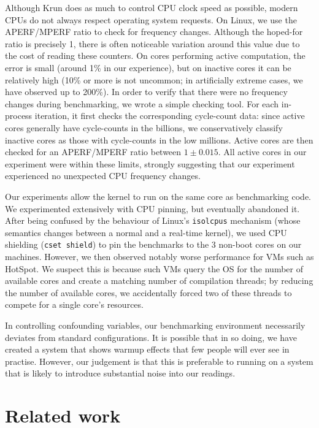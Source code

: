\documentclass[preprint,numbers,10pt]{sigplanconf}
\newcommand{\krun}{Krun\xspace}
\begin{document}
Although \krun does as much to control CPU clock speed as possible, modern CPUs
do not always respect operating system requests. On Linux, we use the
APERF/MPERF ratio to check for frequency changes. Although the hoped-for
ratio is precisely 1, there is often noticeable variation around this value due to the
cost of reading these counters. On cores
performing active computation, the error is small (around 1\% in our
experience), but on inactive cores it can be relatively high (10\% or more is
not uncommon; in artificially extreme cases, we have observed up to 200\%).
In order to verify that there were no frequency changes during benchmarking,
we wrote a simple checking tool. For each in-process iteration, it first checks
the corresponding cycle-count data: since active cores generally have
cycle-counts in the billions, we conservatively classify inactive
cores as those with cycle-counts in the low millions. Active cores are then
checked for an APERF/MPERF ratio between $1 \pm 0.015$. All active cores in our
experiment were within these limits, strongly suggesting that our experiment
experienced no unexpected CPU frequency changes.

Our experiments allow the kernel to run on the same core as benchmarking code.
We experimented extensively with CPU pinning, but eventually abandoned it. After
being confused by the behaviour of Linux's \texttt{isolcpus} mechanism (whose
semantics changes between a normal and a real-time kernel), we used CPU shielding
(\texttt{cset shield}) to pin the benchmarks to the 3 non-boot cores on our
machines. However, we then observed notably worse performance for VMs such as
HotSpot. We suspect this is because such VMs query the OS for the number of
available cores and create a matching number of compilation threads; by reducing
the number of available cores, we accidentally forced two of these threads to
compete for a single core's resources.

In controlling confounding variables, our benchmarking environment necessarily
deviates from standard configurations. It is possible that in so doing, we have
created a system that shows warmup effects that few people will ever see in
practise. However, our judgement is that this is preferable to running on a
system that is likely to introduce substantial noise into our readings.


\section{Related work}
\end{document}
